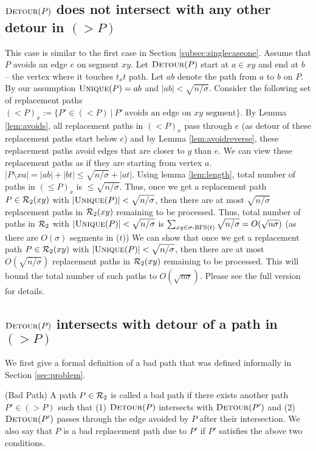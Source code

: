 \iflong
\else
\vspace{-2mm}
\fi



\subsection{ $\textsc{Detour} (P)$ does not intersect with any other detour in $(> P)$ }
\label{subsec:nointersect}
\noindent This case is similar to the first case in Section \ref{subsec:singlecaseone}.
\iflong
  Assume that $P$ avoids an edge $e$ on segment $xy$. Let $\textsc{Detour}(P)$
  start at $a \in xy$ and end at $b$ -- the vertex
  where it touches $t_xt$ path. Let $ab$ denote the
path from $a$ to $b$ on $P$. By our assumption $\textsc{Unique}(P)
  = ab$ and $|ab| < \sqrt{n/\sigma}$. Consider the following set
  of replacement paths  $(< P)_x := \{P' \in (< P)\ |\ P'~ \text{avoids an edge on $xy$ segment}\}$.
  By Lemma \ref{lem:avoids},
  all  replacement paths in $(< P)_x$ pass through $e$ (as
  detour of these replacement paths start below $e$) and by
  Lemma \ref{lem:avoidreverse}, these replacement paths avoid
  edges that are closer to $y$ than $e$. We can view these
  replacement paths as if they are starting from vertex $a$.
   $|P \setminus xa|
  = |ab| + |bt| \le \sqrt {n/\sigma} + |at|$. Using lemma \ref{lem:length}, total
  number of paths in   $(\le P)_x$ is  $\le \sqrt{ n/\sigma}$.  Thus, once we
  get a replacement path $P \in \mathcal{R}_2(xy)$ with $|\textsc{Unique}(P)| < \sqrt{n /\sigma}$, then there
  are at most $\sqrt{n/\sigma}$ replacement paths in $\mathcal{R}_2(xy)$ remaining to be processed.
  Thus, total number of paths in $\mathcal{R}_2$ with  $|\textsc{Unique}(P)|< \sqrt{n/\sigma}$ is
  $\sum_{xy \in \text{$\sigma$-\textsc{BFS}($t$)}} \sqrt{n/ \sigma} = O(\sqrt{n \sigma})$
  (as there are $O(\sigma)$ segments in \SBFS($t$))
\else
   We can show that once we
   get a replacement path $P \in \mathcal{R}_2(xy)$ with $|\textsc{Unique}(P)| < \sqrt{n /\sigma}$, then there
   are at most $O(\sqrt{n/\sigma})$ replacement paths in $\mathcal{R}_2(xy)$ remaining to be processed. This will bound
   the total number of such paths to $O(\sqrt{n\sigma})$. Please see
   the full version for details.
\fi

\iflong
\else
\vspace{-2mm}
\fi
\subsection{ $\textsc{Detour}(P)$ intersects with  detour of a  path in $(> P)$}
\label{subsec:pintersects}

We first give a formal definition of a bad path that was defined informally in Section \ref{sec:problem}.
\begin{definition} (Bad Path)
A path $P \in \mathcal{R}_2$ is called a bad path if there exists another path $P' \in (>P)$
such that (1) $\textsc{Detour}(P)$ intersects with $\textsc{Detour}(P')$ and (2) $\textsc{Detour}(P')$ passes through the edge
avoided by $P$ after their intersection. We also say that $P$ is a bad replacement
path due to $P'$ if $P'$ satisfies the above two conditions.
\end{definition}

